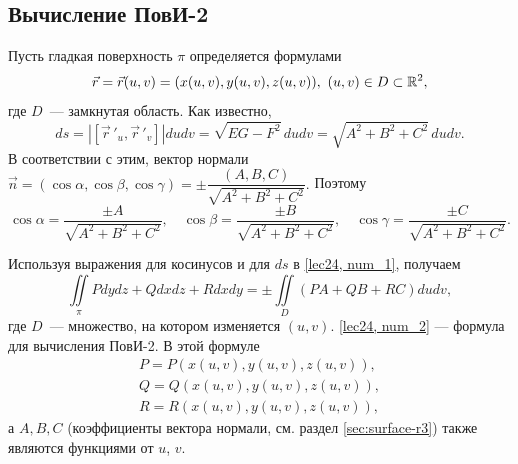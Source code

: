 \documentclass[../../main.tex]{subfiles}
\begin{document}
\subsection{Вычисление ПовИ-2}

Пусть гладкая поверхность $\pi$ определяется формулами \[\vec{r} = \vec{r}(u,v) 
=
 (x(u,v), y(u,v), z(u,v)),\ (u, v)\in D\subset \mathbb{R}^2,\] где $D$~--- замкнутая область.
Как известно, \[ds = \left|\left[ \vec r\,'_u,  \vec r\,'_v\right]\right|dudv = 
\sqrt{EG - F^2}\,dudv = \sqrt{A^2 + B^2 + C^2}\,dudv.\] В соответствии с этим, 
вектор нормали
 $\vec{n} = (\cos\alpha, \cos\beta, \cos\gamma) = \pm\dfrac{(A, B, C)}{\sqrt{A^2
 		 + B^2 + C^2}}.$ Поэтому \[\cos\alpha = \frac{\pm A}{\sqrt{A^2 + B^2 + 
 		 C^2}},\quad \cos\beta = \frac{\pm B}{\sqrt{A^2 + B^2 + C^2}},\quad 
 	 \cos\gamma = \frac{\pm C}{\sqrt{A^2 + B^2 + C^2}}.\]

Используя выражения для косинусов и для $ds$ в \eqref{lec24, num_1}, получаем
\begin{equation}\label{lec24, num_2}
\iint\limits_\pi Pdydz + Qdxdz + Rdxdy = \pm \iint\limits_D(PA + QB + RC)dudv,
\end{equation}
где $D$~--- множество, на котором изменяется $(u, v)$.
\eqref{lec24, num_2} --- формула для вычисления \mbox{ПовИ-2}. В этой формуле
\begin{gather*}
 P = P(x(u,v), y(u,v), z(u,v)), \\
 Q = Q(x(u,v), y(u,v), z(u,v)), \\
 R = R(x(u,v), y(u,v), z(u,v)),
\end{gather*}
а $A, B, C$ (коэффициенты вектора нормали, см. раздел \ref{sec:surface-r3}) также являются функциями от $u$, $v$.
\end{document}
